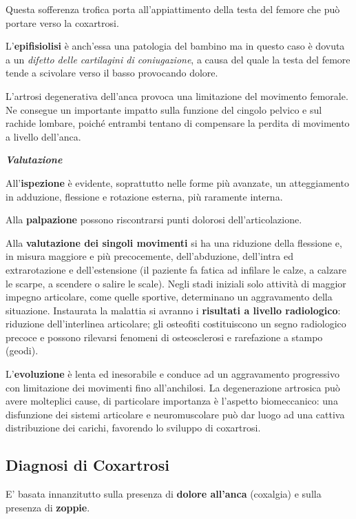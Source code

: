 Questa sofferenza trofica porta all'appiattimento della testa del femore che può portare verso la coxartrosi.

L'\textbf{epifisiolisi} è anch'essa una patologia del bambino ma in questo caso è dovuta a un \emph{difetto delle cartilagini di coniugazione}, a causa del quale la testa del femore tende a scivolare verso il basso provocando dolore.

L'artrosi degenerativa dell'anca provoca una limitazione del movimento femorale. Ne consegue un importante impatto sulla funzione del cingolo pelvico e sul rachide lombare, poiché entrambi tentano di compensare la perdita di movimento a livello dell'anca.

\textbf{\emph{Valutazione}}

All'\textbf{ispezione} è evidente, soprattutto nelle forme più avanzate, un atteggiamento in adduzione, flessione e rotazione esterna, più raramente interna.

Alla \textbf{palpazione} possono riscontrarsi punti dolorosi dell'articolazione.

Alla \textbf{valutazione dei singoli movimenti} si ha una riduzione della flessione e, in misura maggiore e più precocemente, dell'abduzione, dell'intra ed extrarotazione e dell'estensione (il paziente fa fatica ad infilare le calze, a calzare le scarpe, a scendere o salire le scale). Negli stadi iniziali solo attività di maggior impegno articolare, come quelle sportive, determinano un aggravamento della situazione. Instaurata la malattia si avranno i \textbf{risultati a livello radiologico}: riduzione dell'interlinea articolare; gli osteofiti costituiscono un segno radiologico precoce e possono rilevarsi fenomeni di osteosclerosi e rarefazione a stampo (geodi).

L'\textbf{evoluzione} è lenta ed inesorabile e conduce ad un aggravamento progressivo con limitazione dei movimenti fino all'anchilosi. La degenerazione artrosica può avere molteplici cause, di particolare importanza è l'aspetto biomeccanico: una disfunzione dei sistemi articolare e neuromuscolare può dar luogo ad una cattiva distribuzione dei carichi, favorendo lo sviluppo di coxartrosi.

\subsection{Diagnosi di Coxartrosi}

E' basata innanzitutto sulla presenza di \textbf{dolore all'anca} (coxalgia) e sulla presenza di \textbf{zoppie}.

